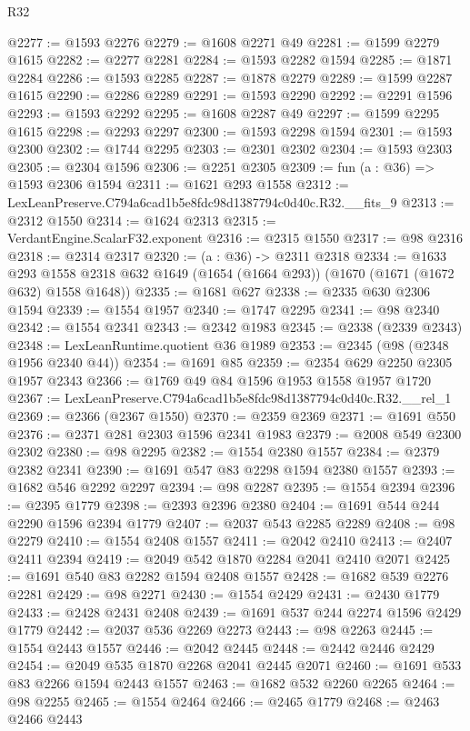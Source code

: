 \begin{lexlean}{R32}
\begin{coremodule}
@2277 := @1593 @2276
@2279 := @1608 @2271 @49
@2281 := @1599 @2279 @1615
@2282 := @2277 @2281
@2284 := @1593 @2282 @1594
@2285 := @1871 @2284
@2286 := @1593 @2285
@2287 := @1878 @2279
@2289 := @1599 @2287 @1615
@2290 := @2286 @2289
@2291 := @1593 @2290
@2292 := @2291 @1596
@2293 := @1593 @2292
@2295 := @1608 @2287 @49
@2297 := @1599 @2295 @1615
@2298 := @2293 @2297
@2300 := @1593 @2298 @1594
@2301 := @1593 @2300
@2302 := @1744 @2295
@2303 := @2301 @2302
@2304 := @1593 @2303
@2305 := @2304 @1596
@2306 := @2251 @2305
@2309 := fun (a : @36) => @1593 @2306 @1594
@2311 := @1621 @293 @1558
@2312 := LexLeanPreserve.C794a6cad1b5e8fdc98d1387794c0d40c.R32.__fits_9
@2313 := @2312 @1550
@2314 := @1624 @2313
@2315 := VerdantEngine.ScalarF32.exponent
@2316 := @2315 @1550
@2317 := @98 @2316
@2318 := @2314 @2317
@2320 := (a : @36) -> @2311 @2318
@2334 := @1633
    @293
    @1558
    @2318
    @632
    @1649
    (@1654 (@1664 @293))
    (@1670 (@1671 (@1672 @632) @1558 @1648))
@2335 := @1681 @627
@2338 := @2335 @630 @2306 @1594
@2339 := @1554 @1957
@2340 := @1747 @2295
@2341 := @98 @2340
@2342 := @1554 @2341
@2343 := @2342 @1983
@2345 := @2338 (@2339 @2343)
@2348 := LexLeanRuntime.quotient @36 @1989
@2353 := @2345 (@98 (@2348 @1956 @2340 @44))
@2354 := @1691 @85
@2359 := @2354 @629 @2250 @2305 @1957 @2343
@2366 := @1769 @49 @84 @1596 @1953 @1558 @1957 @1720
@2367 := LexLeanPreserve.C794a6cad1b5e8fdc98d1387794c0d40c.R32.__rel_1
@2369 := @2366 (@2367 @1550)
@2370 := @2359 @2369
@2371 := @1691 @550
@2376 := @2371 @281 @2303 @1596 @2341 @1983
@2379 := @2008 @549 @2300 @2302
@2380 := @98 @2295
@2382 := @1554 @2380 @1557
@2384 := @2379 @2382 @2341
@2390 := @1691 @547 @83 @2298 @1594 @2380 @1557
@2393 := @1682 @546 @2292 @2297
@2394 := @98 @2287
@2395 := @1554 @2394
@2396 := @2395 @1779
@2398 := @2393 @2396 @2380
@2404 := @1691 @544 @244 @2290 @1596 @2394 @1779
@2407 := @2037 @543 @2285 @2289
@2408 := @98 @2279
@2410 := @1554 @2408 @1557
@2411 := @2042 @2410
@2413 := @2407 @2411 @2394
@2419 := @2049 @542 @1870 @2284 @2041 @2410 @2071
@2425 := @1691 @540 @83 @2282 @1594 @2408 @1557
@2428 := @1682 @539 @2276 @2281
@2429 := @98 @2271
@2430 := @1554 @2429
@2431 := @2430 @1779
@2433 := @2428 @2431 @2408
@2439 := @1691 @537 @244 @2274 @1596 @2429 @1779
@2442 := @2037 @536 @2269 @2273
@2443 := @98 @2263
@2445 := @1554 @2443 @1557
@2446 := @2042 @2445
@2448 := @2442 @2446 @2429
@2454 := @2049 @535 @1870 @2268 @2041 @2445 @2071
@2460 := @1691 @533 @83 @2266 @1594 @2443 @1557
@2463 := @1682 @532 @2260 @2265
@2464 := @98 @2255
@2465 := @1554 @2464
@2466 := @2465 @1779
@2468 := @2463 @2466 @2443

\end{coremodule}
\end{lexlean}
